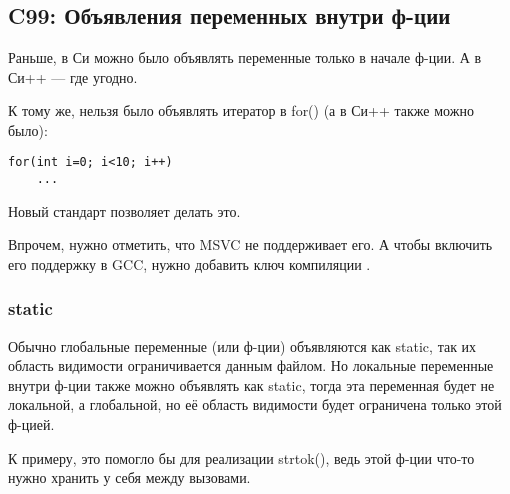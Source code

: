 ﻿\chapter{}
\section{C99: Объявления переменных внутри ф-ции}

Раньше, в Си можно было объявлять переменные только в начале ф-ции. А в Си++ --- где угодно.

К тому же, нельзя было объявлять итератор в for() (а в Си++ также можно было):

\begin{lstlisting}
for(int i=0; i<10; i++)
	...
\end{lstlisting}

Новый стандарт\cite{C99TC3} позволяет делать это.

Впрочем, нужно отметить, что MSVC не поддерживает его. А чтобы включить его поддержку в GCC, нужно добавить ключ
компиляции .

\subsection{static}

Обычно глобальные переменные (или ф-ции) объявляются как static, так их область видимости ограничивается 
данным файлом. Но локальные переменные внутри ф-ции также можно объявлять как static, тогда эта переменная
будет не локальной, а глобальной, но её область видимости будет ограничена только этой ф-цией.

К примеру, это помогло бы для реализации strtok(), ведь этой ф-ции что-то нужно хранить у себя между вызовами.

